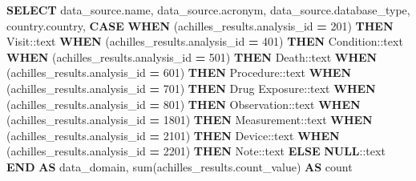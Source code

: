 \documentclass[
]{book}
\newenvironment{Shaded}{\begin{snugshade}}{\end{snugshade}}
\newcommand{\CharTok}[1]{\textcolor[rgb]{0.31,0.60,0.02}{#1}}
\newcommand{\ControlFlowTok}[1]{\textcolor[rgb]{0.13,0.29,0.53}{\textbf{#1}}}
\newcommand{\DecValTok}[1]{\textcolor[rgb]{0.00,0.00,0.81}{#1}}
\newcommand{\FunctionTok}[1]{\textcolor[rgb]{0.00,0.00,0.00}{#1}}
\newcommand{\KeywordTok}[1]{\textcolor[rgb]{0.13,0.29,0.53}{\textbf{#1}}}
\newcommand{\NormalTok}[1]{#1}
\newcommand{\OperatorTok}[1]{\textcolor[rgb]{0.81,0.36,0.00}{\textbf{#1}}}
\newcommand{\StringTok}[1]{\textcolor[rgb]{0.31,0.60,0.02}{#1}}
\begin{document}
\begin{Shaded}
\begin{Highlighting}[]
\KeywordTok{SELECT}\NormalTok{ data\_source.name,}
\NormalTok{   data\_source.acronym,}
\NormalTok{   data\_source.database\_type,}
\NormalTok{   country.country,}
       \ControlFlowTok{CASE}
           \ControlFlowTok{WHEN}\NormalTok{ (achilles\_results.analysis\_id }\OperatorTok{=} \DecValTok{201}\NormalTok{) }\ControlFlowTok{THEN} \StringTok{\textquotesingle{}Visit\textquotesingle{}}\NormalTok{:}\CharTok{:text}
           \ControlFlowTok{WHEN}\NormalTok{ (achilles\_results.analysis\_id }\OperatorTok{=} \DecValTok{401}\NormalTok{) }\ControlFlowTok{THEN} \StringTok{\textquotesingle{}Condition\textquotesingle{}}\NormalTok{:}\CharTok{:text}
           \ControlFlowTok{WHEN}\NormalTok{ (achilles\_results.analysis\_id }\OperatorTok{=} \DecValTok{501}\NormalTok{) }\ControlFlowTok{THEN} \StringTok{\textquotesingle{}Death\textquotesingle{}}\NormalTok{:}\CharTok{:text}
           \ControlFlowTok{WHEN}\NormalTok{ (achilles\_results.analysis\_id }\OperatorTok{=} \DecValTok{601}\NormalTok{) }\ControlFlowTok{THEN} \StringTok{\textquotesingle{}Procedure\textquotesingle{}}\NormalTok{:}\CharTok{:text}
           \ControlFlowTok{WHEN}\NormalTok{ (achilles\_results.analysis\_id }\OperatorTok{=} \DecValTok{701}\NormalTok{) }\ControlFlowTok{THEN} \StringTok{\textquotesingle{}Drug Exposure\textquotesingle{}}\NormalTok{:}\CharTok{:text}
           \ControlFlowTok{WHEN}\NormalTok{ (achilles\_results.analysis\_id }\OperatorTok{=} \DecValTok{801}\NormalTok{) }\ControlFlowTok{THEN} \StringTok{\textquotesingle{}Observation\textquotesingle{}}\NormalTok{:}\CharTok{:text}
           \ControlFlowTok{WHEN}\NormalTok{ (achilles\_results.analysis\_id }\OperatorTok{=} \DecValTok{1801}\NormalTok{) }\ControlFlowTok{THEN} \StringTok{\textquotesingle{}Measurement\textquotesingle{}}\NormalTok{:}\CharTok{:text}
           \ControlFlowTok{WHEN}\NormalTok{ (achilles\_results.analysis\_id }\OperatorTok{=} \DecValTok{2101}\NormalTok{) }\ControlFlowTok{THEN} \StringTok{\textquotesingle{}Device\textquotesingle{}}\NormalTok{:}\CharTok{:text}
           \ControlFlowTok{WHEN}\NormalTok{ (achilles\_results.analysis\_id }\OperatorTok{=} \DecValTok{2201}\NormalTok{) }\ControlFlowTok{THEN} \StringTok{\textquotesingle{}Note\textquotesingle{}}\NormalTok{:}\CharTok{:text}
           \ControlFlowTok{ELSE} \KeywordTok{NULL}\NormalTok{:}\CharTok{:text}
       \ControlFlowTok{END} \KeywordTok{AS}\NormalTok{ data\_domain,}
   \FunctionTok{sum}\NormalTok{(achilles\_results.count\_value) }\KeywordTok{AS} \FunctionTok{count}

\end{Highlighting}
\end{Shaded}
\end{document}
